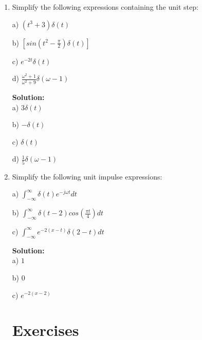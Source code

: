 \documentclass[12pt]{article}
\newenvironment{solution}{\vspace{2mm}\color{blue}\textbf{Solution: }}{\color{black}}
\begin{document}
\begin{enumerate}[\qquad 1)]
    \begin{solution}
         \[y(t) = (t-1)u(t-1) - (t-2)u(t-2)-u(t-4)\]
        Each term in the solution serves a specific role in the visual characteristic of the signal. The first term, $(t-1)u(t-1)$ acts as the increasing ramp in the interval $1 \leq t \leq 2$. \par
        Then, the following term $(t-2)u(t-2)$ cancels out the increasing ramp for $t > 2$. Lastly, $u(t-4)$ gives us the familiar rectangle ending at $t=4$.
    \end{solution}

    \newpage


    \item Simplify the following expressions containing the unit step:
    
    a) $(t^3 + 3)\delta(t)$

    b) $[sin(t^2 - \frac{\pi}{2})\delta(t)]$

    c) $e^{-2t}\delta(t)$

    d) $\frac{\omega^2 + 1}{\omega^2 + 9}\delta(\omega - 1)$

    \begin{solution}
        \\
        a) $3\delta(t)$

        b) $-\delta(t)$

        c) $\delta(t)$

        d) $\frac{1}{5}\delta(\omega - 1)$
    \end{solution}


    \item Simplify the following unit impulse expressions:
    
    a) $\int_{-\infty}^{\infty} \delta(t)e^{-j\omega t}dt $

    b) $\int_{-\infty}^{\infty} \delta(t-2)cos(\frac{\pi t}{4}) dt $

    c) $\int_{-\infty}^{\infty} e^{-2(x-t)}\delta(2-t)dt $

    \begin{solution}
        \\
        a) $1$

        b) $0$

        c) $e^{-2(x-2)}$
    \end{solution}

\newpage
\section*{Exercises}


\end{enumerate}
\end{document}
